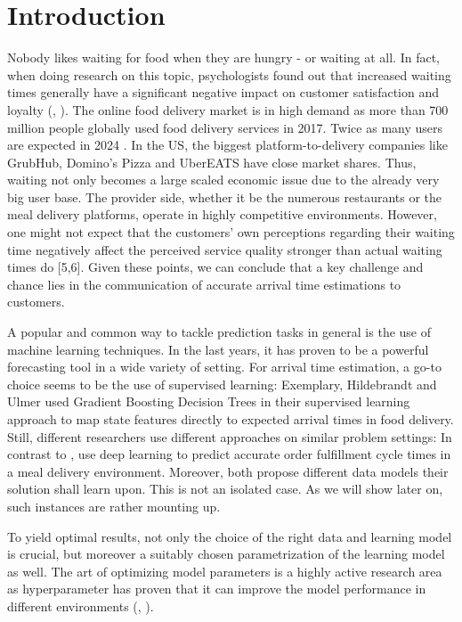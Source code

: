 \chapter{Introduction}
Nobody likes waiting for food when they are hungry - or waiting at all. In fact, when doing research on this topic, psychologists found out that increased waiting times generally have a significant negative impact on customer satisfaction and loyalty (\citealt{WaitingTime1}, \citealt{WaitingTime2}). The online food delivery market is in high demand as more than 700 million people globally used food delivery services in 2017. Twice as many users are expected in 2024 \citep{Statista1}. In the US, the biggest platform-to-delivery companies like GrubHub, Domino's Pizza and UberEATS have close market shares. Thus, waiting not only becomes a large scaled economic issue due to the already very big user base. The provider side, whether it be the numerous restaurants or the meal delivery platforms, operate in highly competitive environments. However, one might not expect that the customers’ own perceptions regarding their waiting time negatively affect the perceived service quality stronger than actual waiting times do [5,6]. Given these points, we can conclude that a key challenge and chance lies in the communication of accurate arrival time estimations to customers. 

A popular and common way to tackle prediction tasks in general is the use of machine learning techniques. In the last years, it has proven to be a powerful forecasting tool in a wide variety of setting. For arrival time estimation, a go-to choice seems to be the use of supervised learning: Exemplary, Hildebrandt and Ulmer used Gradient Boosting Decision Trees in their supervised learning approach to map state features directly to expected arrival times in food delivery. Still, different researchers use different approaches on similar problem settings: In contrast to \cite{Hildebrandt2020_EAT}, \cite{Zhu2020_OFCTE_DL} use deep learning to predict accurate order fulfillment cycle times in a meal delivery environment. Moreover, both propose different data models their solution shall learn upon. This is not an isolated case. As we will show later on, such instances are rather mounting up. 

To yield optimal results, not only the choice of the right data and learning model is crucial, but moreover a suitably chosen parametrization of the learning model as well. The art of optimizing model parameters is a highly active research area as hyperparameter has proven that it can improve the model performance in different environments (\citealt{HPOMotivation}, \citealt{WU201926}).

